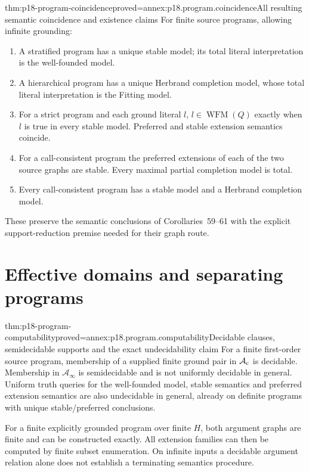 \begin{hbtheorem}{thm:p18-program-coincidence}{proved=annex:p18.program.coincidence}{All resulting semantic coincidence and existence claims}
For finite source programs, allowing infinite grounding:
\begin{enumerate}
\item A stratified program has a unique stable
      model; its total literal interpretation
      is the well-founded model.
\item A hierarchical program has a unique
      Herbrand completion model, whose total
      literal interpretation is the Fitting model.
\item For a strict program and each ground
      literal \(l\), \(l\in\operatorname{WFM}(Q)\)
      exactly when \(l\) is true in every
      stable model. Preferred and stable
      extension semantics coincide.
\item For a call-consistent program the
      preferred extensions of each of the
      two source graphs are stable.
      Every maximal partial completion
      model is total.
\item Every call-consistent program has a
      stable model and a Herbrand completion
      model.
\end{enumerate}
These preserve the semantic conclusions
of Corollaries~59--61 with the explicit
support-reduction premise needed for
their graph route.
\end{hbtheorem}

\section{Effective domains and separating programs}

\begin{hbtheorem}{thm:p18-program-computability}{proved=annex:p18.program.computability}{Decidable clauses, semidecidable supports and the exact undecidability claim}
For a finite first-order source program,
membership of a supplied finite ground pair
in \(\mathcal A_{\rm c}\) is decidable.
Membership in \(\mathcal A_\infty\) is
semidecidable and is not uniformly decidable
in general. Uniform truth queries for
the well-founded model, stable semantics
and preferred extension semantics are
also undecidable in general, already
on definite programs with unique
stable/preferred conclusions.

For a finite explicitly grounded program
over finite \(H\), both argument graphs
are finite and can be constructed exactly.
All extension families can then be
computed by finite subset enumeration.
On infinite inputs a decidable argument
relation alone does not establish a
terminating semantics procedure.
\end{hbtheorem}

